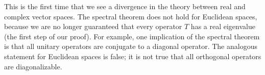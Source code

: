 This is the first time that we see a divergence in the theory between real and complex vector spaces. The spectral theorem does not hold for Euclidean spaces, because we are no longer guaranteed that every operator $T$ has a real eigenvalue (the first step of our proof). For example, one implication of the spectral theorem is that all unitary operators are conjugate to a diagonal operator. The analogous statement for Euclidean spaces is false; it is not true that all orthogonal operators are diagonalizable. 

